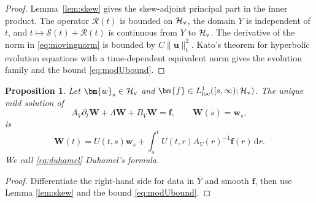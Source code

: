 \documentclass[11pt,reqno]{amsart}
\newtheorem{proposition}{Proposition}[section]
\newcommand{\dd}{\,\mathrm{d}}
\numberwithin{equation}{section}
\begin{document}
\begin{proof} 
Lemma~\ref{lem:skew} gives the skew-adjoint principal part in the inner product. The operator $\mathcal R(t)$ is bounded on $\mathcal H_{\rm v}$, the domain $Y$ is independent of $t$, and $t\mapsto \mathcal{S}(t)+\mathcal{R}(t)$ is continuous from $Y$ to $\mathcal H_{\rm v}$. The derivative of the norm in \eqref{eq:movingnorm} is bounded by $C\|\bm{u}\|_t^2$. Kato's theorem for hyperbolic evolution equations with a time-dependent equivalent norm \cite{Kato1970,Kato1973} gives the evolution family and the bound \eqref{eq:modUbound}. 
\end{proof}

\begin{proposition}
Let $\bm{w}_s\in\mathcal H_{\rm v}$ and $\bm{f}\in L^1_{\rm loc}([s,\infty);\mathcal H_{\rm v})$. The unique mild solution of
$$
A_V\partial_t\bm{W}+\Lambda \bm{W}+B_V\bm{W}=\bm{f}, \qquad \bm{W}(s)=\bm{w}_s,
$$
is
\begin{equation}\label{eq:duhamel}
\bm W(t)=U(t,s)\bm{w}_s + \int_s^t U(t,r)A_V(r)^{-1}\bm{f}(r)\dd r.
\end{equation}
We call \eqref{eq:duhamel} Duhamel's formula.
\end{proposition}

\begin{proof} 
Differentiate the right-hand side for data in $Y$ and smooth $\bm{f}$, then use Lemma \ref{lem:skew} and the bound \eqref{eq:modUbound}. 
\end{proof}
\end{document}
